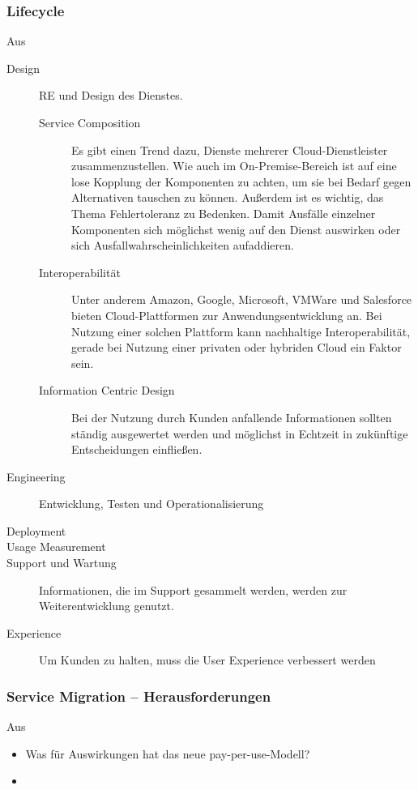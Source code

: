 \subsubsection{Lifecycle}
Aus 
\begin{description}
	\item[Design] RE und Design des Dienstes. 
	\begin{description}
	\item[Service Composition] Es gibt einen Trend dazu, Dienste mehrerer 
Cloud-Dienstleister zusammenzustellen. Wie auch im On-Premise-Bereich ist auf 
eine lose Kopplung der Komponenten zu achten, um sie bei Bedarf gegen 
Alternativen tauschen zu können. Außerdem ist es wichtig, das Thema 
Fehlertoleranz zu Bedenken. Damit Ausfälle einzelner Komponenten sich möglichst 
wenig auf den Dienst auswirken oder sich Ausfallwahrscheinlichkeiten 
aufaddieren.
	\item[Interoperabilität] Unter anderem Amazon, Google, Microsoft, 
VMWare und Salesforce bieten Cloud-Plattformen zur Anwendungsentwicklung an. 
Bei Nutzung einer solchen Plattform kann nachhaltige Interoperabilität, gerade 
bei Nutzung einer privaten oder hybriden Cloud ein Faktor sein.
	\item[Information Centric Design] Bei der Nutzung durch Kunden 
anfallende Informationen sollten ständig ausgewertet werden und möglichst in 
Echtzeit in zukünftige Entscheidungen einfließen. 
\end{description}
	\item[Engineering] Entwicklung, Testen und Operationalisierung \\
	\item[Deployment] 
	\item[Usage Measurement]
	\item[Support und Wartung] Informationen, die im Support gesammelt 
werden, werden zur Weiterentwicklung genutzt.
	\item[Experience] Um Kunden zu halten, muss die User Experience 
verbessert werden
\end{description}

\subsubsection{Service Migration -- Herausforderungen}
Aus 
\begin{itemize}
	\item Was für Auswirkungen hat das neue pay-per-use-Modell?
	\item 
\end{itemize}

